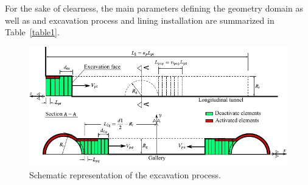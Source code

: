 \documentclass[a4paper,fleqn]{cas-sc}
\begin{document}
For the sake of clearness, the main parameters defining the geometry domain as well as and excavation process and lining installation are summarized in Table~\ref{table1}. 
\begin{figure}[h!]
	\centering
	\includegraphics[scale=1.3]{Diagram of excavations.pdf}
	\caption{Schematic representation of the excavation process.}
	\label{Diagram of excavations}
\end{figure}
\FloatBarrier
\end{document}
